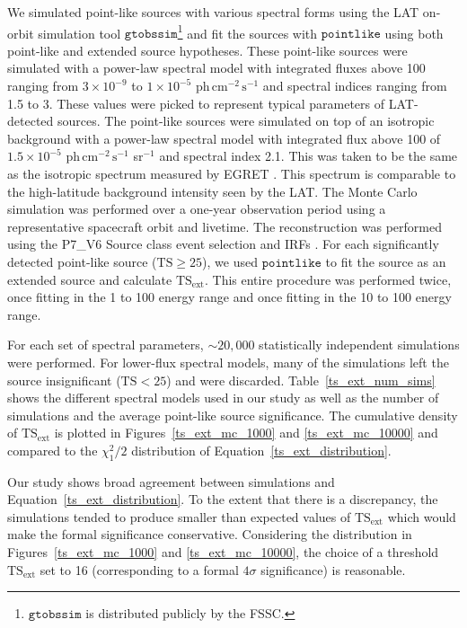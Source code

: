 \documentclass[12pt,preprint]{aastex}
\newcommand{\mev}{\text{MeV}\xspace}
\newcommand{\gev}{\text{GeV}\xspace}
\newcommand{\phflux}{\ensuremath{\text{ph}\,\text{cm}^{-2}\,\text{s}^{-1}}\xspace}
\newcommand{\tsext}{{\ensuremath{\text{TS}_{\text{ext}}}}\xspace}
\newcommand{\ts}{\text{TS}\xspace}
\newcommand{\pointlike}{\ensuremath{\mathtt{pointlike}}\xspace}
\newcommand{\gtobssim}{\ensuremath{\mathtt{gtobssim}}\xspace}
\begin{document}
We simulated point-like sources with various spectral forms using
the LAT on-orbit simulation tool
\gtobssim\footnote{\gtobssim is distributed publicly by the FSSC.} and fit the sources
with \pointlike using both point-like
and extended source hypotheses.  These point-like sources were simulated with a power-law
spectral model with integrated fluxes above 100 \mev ranging from $3\times10^{-9}$ 
to $1\times10^{-5}$ \phflux and spectral
indices ranging from 1.5 to 3.  These values
were picked to represent typical parameters of LAT-detected
sources. The point-like sources were simulated on top of an isotropic
background with a power-law spectral model with
integrated flux above 100 \mev of $1.5\times10^{-5}$ \phflux sr$^{-1}$
and spectral index 2.1.
This was
taken to be the same as the isotropic spectrum measured by EGRET
\citep{sreekumar_isotropic}.  This spectrum is comparable
to the high-latitude background intensity seen by the LAT.
The Monte Carlo simulation was performed
over a one-year observation period using a representative 
spacecraft orbit and livetime.
The reconstruction was performed
using the P7\_V6 Source class event selection and IRFs \citep{lat_on_orbit_psf}. For each 
significantly detected point-like source ($\ts\ge25$), we used \pointlike
to fit the source as an extended source and calculate \tsext.
This entire procedure was performed twice, once fitting in the 1 \gev
to 100 \gev energy range and once fitting in the 10 \gev to 100 \gev
energy range.

For each set of spectral parameters, $\sim20,000$ statistically independent
simulations were performed. For lower-flux spectral models, many of the
simulations left the source insignificant ($\ts<25$)
and were discarded.  Table~\ref{ts_ext_num_sims}
shows the different spectral models used in our study as well as the
number of simulations and the average point-like source
significance.  The cumulative density of \tsext is plotted in
Figures~\ref{ts_ext_mc_1000} and \ref{ts_ext_mc_10000} 
and compared to the $\chi^2_1/2$ distribution of
Equation~\ref{ts_ext_distribution}.

Our study shows broad agreement between simulations and
Equation~\ref{ts_ext_distribution}. To the extent that there is
a discrepancy, the simulations tended to produce smaller than expected
values of \tsext which would make the formal significance conservative.
Considering the distribution in Figures~\ref{ts_ext_mc_1000} and
\ref{ts_ext_mc_10000}, the choice of a threshold \tsext set to 16
(corresponding to a formal $4\sigma$ significance) is reasonable.
\end{document}
